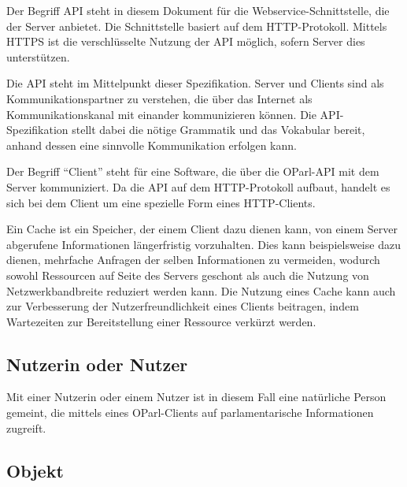 \documentclass[,a4paper]{article}
\begin{document}
Der Begriff API steht in diesem Dokument für die
Webservice-Schnittstelle, die der Server anbietet. Die Schnittstelle
basiert auf dem HTTP-Protokoll. Mittels HTTPS ist die verschlüsselte
Nutzung der API möglich, sofern Server dies unterstützen.

Die API steht im Mittelpunkt dieser Spezifikation. Server und Clients
sind als Kommunikationspartner zu verstehen, die über das Internet als
Kommunikationskanal mit einander kommunizieren können. Die
API-Spezifikation stellt dabei die nötige Grammatik und das Vokabular
bereit, anhand dessen eine sinnvolle Kommunikation erfolgen kann.


Der Begriff ``Client'' steht für eine Software, die über die OParl-API
mit dem Server kommuniziert. Da die API auf dem HTTP-Protokoll aufbaut,
handelt es sich bei dem Client um eine spezielle Form eines
HTTP-Clients.


Ein Cache ist ein Speicher, der einem Client dazu dienen kann, von einem
Server abgerufene Informationen längerfristig vorzuhalten. Dies kann
beispielsweise dazu dienen, mehrfache Anfragen der selben Informationen
zu vermeiden, wodurch sowohl Ressourcen auf Seite des Servers geschont
als auch die Nutzung von Netzwerkbandbreite reduziert werden kann. Die
Nutzung eines Cache kann auch zur Verbesserung der Nutzerfreundlichkeit
eines Clients beitragen, indem Wartezeiten zur Bereitstellung einer
Ressource verkürzt werden.

\subsection{Nutzerin oder Nutzer}\label{nutzerin}

Mit einer Nutzerin oder einem Nutzer ist in diesem Fall eine natürliche
Person gemeint, die mittels eines OParl-Clients auf parlamentarische
Informationen zugreift.

\subsection{Objekt}\label{objekt}
\end{document}
